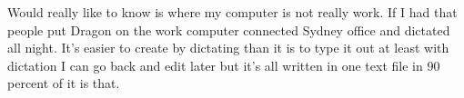 \documentclass{report}
\begin{document}
Would really like to know is where my computer is not really work. If I had that people put Dragon on the work computer connected Sydney office and dictated all night. It's easier to create by dictating than it is to type it out at least with dictation I can go back and edit later but it's all written in one text file in 90 percent of it is that. 






\ifstandalone


\end{document}
